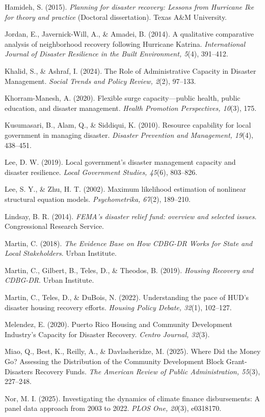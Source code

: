 \documentclass[
  number]{elsarticle}
\begin{document}
Hamideh, S. (2015). \emph{Planning for disaster recovery: Lessons from
Hurricane Ike for theory and practice} (Doctoral dissertation). Texas
A\&M University.

Jordan, E., Javernick-Will, A., \& Amadei, B. (2014). A qualitative
comparative analysis of neighborhood recovery following Hurricane
Katrina. \emph{International Journal of Disaster Resilience in the Built
Environment, 5}(4), 391--412.

Khalid, S., \& Ashraf, I. (2024). The Role of Administrative Capacity in
Disaster Management. \emph{Social Trends and Policy Review, 2}(2),
97--133.

Khorram-Manesh, A. (2020). Flexible surge capacity---public health,
public education, and disaster management. \emph{Health Promotion
Perspectives, 10}(3), 175.

Kusumasari, B., Alam, Q., \& Siddiqui, K. (2010). Resource capability
for local government in managing disaster. \emph{Disaster Prevention and
Management, 19}(4), 438--451.

Lee, D. W. (2019). Local government's disaster management capacity and
disaster resilience. \emph{Local Government Studies, 45}(6), 803--826.

Lee, S. Y., \& Zhu, H. T. (2002). Maximum likelihood estimation of
nonlinear structural equation models. \emph{Psychometrika, 67}(2),
189--210.

Lindsay, B. R. (2014). \emph{FEMA's disaster relief fund: overview and
selected issues}. Congressional Research Service.

Martin, C. (2018). \emph{The Evidence Base on How CDBG-DR Works for
State and Local Stakeholders}. Urban Institute.

Martin, C., Gilbert, B., Teles, D., \& Theodos, B. (2019). \emph{Housing
Recovery and CDBG-DR}. Urban Institute.

Martin, C., Teles, D., \& DuBois, N. (2022). Understanding the pace of
HUD's disaster housing recovery efforts. \emph{Housing Policy Debate,
32}(1), 102--127.

Melendez, E. (2020). Puerto Rico Housing and Community Development
Industry's Capacity for Disaster Recovery. \emph{Centro Journal, 32}(3).

Miao, Q., Best, K., Reilly, A., \& Davlasheridze, M. (2025). Where Did
the Money Go? Assessing the Distribution of the Community Development
Block Grant-Disasters Recovery Funds. \emph{The American Review of
Public Administration, 55}(3), 227--248.

Nor, M. I. (2025). Investigating the dynamics of climate finance
disbursements: A panel data approach from 2003 to 2022. \emph{PLOS One,
20}(3), e0318170.
\end{document}
